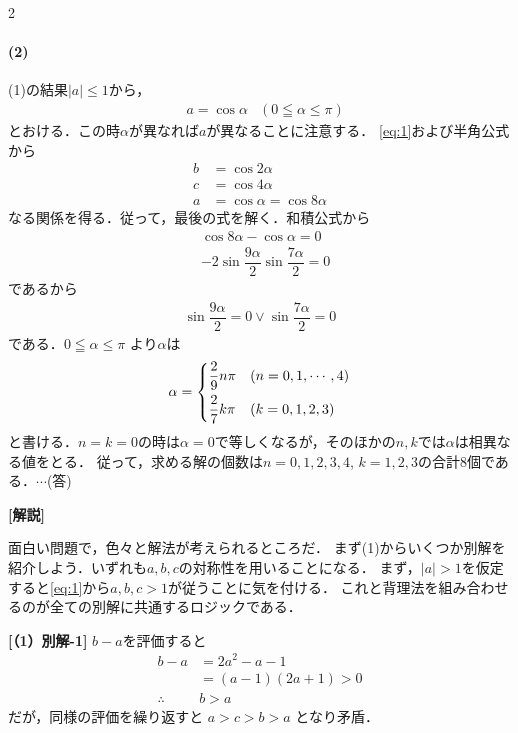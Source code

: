 \documentclass[../../main.tex]{subfiles}
\begin{document}
\begin{multicols}{2}
  \paragraph{(2)}
  (1)の結果$|a|\le 1$から，
  \begin{align}
    & a = \cos \alpha & (0 \leqq \alpha \le \pi)
  \end{align}
  とおける．この時$\alpha$が異なれば$a$が異なることに注意する．
  \cref{eq:1}および半角公式から
  \begin{align}
    b & = \cos 2\alpha                \\
    c & = \cos 4\alpha                \\
    a & =  \cos \alpha = \cos 8\alpha
  \end{align}
  なる関係を得る．従って，最後の式を解く．和積公式から
  \begin{align}
    & \cos 8\alpha - \cos \alpha = 0                      \\
    & -2\sin \dfrac{9\alpha}{2} \sin \dfrac{7\alpha}{2} = 0
  \end{align}
  であるから
  \begin{align}
    \sin \dfrac{9\alpha}{2} = 0 \lor \sin \dfrac{7\alpha}{2}=0
  \end{align}
  である．$0 \leqq \alpha \le \pi$ より$\alpha$は
  \begin{align}
    \alpha =
    \begin{dcases}
      \dfrac{2}{9} n \pi & (n=0,1,\cdots,4) \\
      \dfrac{2}{7} k \pi & (k=0,1,2,3)
    \end{dcases}
  \end{align}
  と書ける．$n=k=0$の時は$\alpha=0$で等しくなるが，そのほかの$n,k$では$\alpha$は相異なる値をとる．
  従って，求める解の個数は$n=0,1,2,3,4$, $k=1,2,3$の合計$8$個である．$\cdots$(答)

  {\bf [解説]}

  面白い問題で，色々と解法が考えられるところだ．
  まず(1)からいくつか別解を紹介しよう．いずれも$a,b,c$の対称性を用いることになる．
  まず，$|a|>1$を仮定すると\cref{eq:1}から$a,b,c>1$が従うことに気を付ける．
  これと背理法を組み合わせるのが全ての別解に共通するロジックである．

  \textbf{[（1）別解-1]}
  $b-a$を評価すると
  \begin{align}
    b-a
    & = 2a^2-a-1      \\
    & = (a-1)(2a+1)>0 \\
    \therefore
    & b>a
  \end{align}
  だが，同様の評価を繰り返すと $a>c>b>a$ となり矛盾．


\end{multicols}
\end{document}
